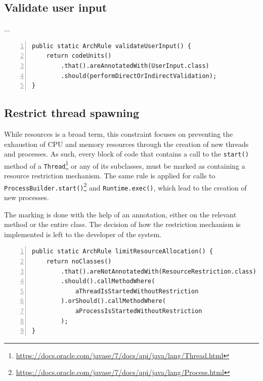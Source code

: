 

\subsection{Validate user input}
...

\begin{minipage}{\linewidth}
\begin{lstlisting}[caption={Rule definition for constraint 4.}, captionpos=b, label=lst:constraint_4_impl, numbers=left]
public static ArchRule validateUserInput() {
    return codeUnits()
        .that().areAnnotatedWith(UserInput.class)
        .should(performDirectOrIndirectValidation);
}
\end{lstlisting}
\end{minipage}

\subsection{Restrict thread spawning}
While resources is a broad term, this constraint focuses on preventing the exhaustion of CPU and memory resources through the creation of new threads and processes. As such, every block of code that contains a call to the \texttt{start()} method of a \texttt{Thread}\footnote{\url{https://docs.oracle.com/javase/7/docs/api/java/lang/Thread.html}} or any of its subclasses, must be marked as containing a resource restriction mechanism. The same rule is applied for calls to \texttt{ProcessBuilder.start()}\footnote{\url{https://docs.oracle.com/javase/7/docs/api/java/lang/Process.html}} and \texttt{Runtime.exec()}\footnotemark[3], which lead to the creation of new processes.

The marking is done with the help of an annotation, either on the relevant method or the entire class. The decision of how the restriction mechanism is implemented is left to the developer of the system.

\begin{minipage}{\linewidth}
\begin{lstlisting}[caption={Rule definition for constraint 5.}, captionpos=b, label=lst:constraint_5_impl, numbers=left]
public static ArchRule limitResourceAllocation() {
    return noClasses()
        .that().areNotAnnotatedWith(ResourceRestriction.class)
        .should().callMethodWhere(
            aThreadIsStartedWithoutRestriction
        ).orShould().callMethodWhere(
            aProcessIsStartedWithoutRestriction
        );
}
\end{lstlisting}
\end{minipage}





